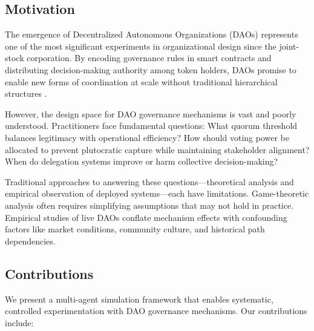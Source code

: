 
\subsection{Motivation}

The emergence of Decentralized Autonomous Organizations (DAOs) represents one of the most significant experiments in organizational design since the joint-stock corporation. By encoding governance rules in smart contracts and distributing decision-making authority among token holders, DAOs promise to enable new forms of coordination at scale without traditional hierarchical structures \citep{buterin2014dao, wright2015decentralized}.

However, the design space for DAO governance mechanisms is vast and poorly understood. Practitioners face fundamental questions: What quorum threshold balances legitimacy with operational efficiency? How should voting power be allocated to prevent plutocratic capture while maintaining stakeholder alignment? When do delegation systems improve or harm collective decision-making?

Traditional approaches to answering these questions---theoretical analysis and empirical observation of deployed systems---each have limitations. Game-theoretic analysis often requires simplifying assumptions that may not hold in practice. Empirical studies of live DAOs conflate mechanism effects with confounding factors like market conditions, community culture, and historical path dependencies.

\subsection{Contributions}

We present a multi-agent simulation framework that enables systematic, controlled experimentation with DAO governance mechanisms. Our contributions include:

